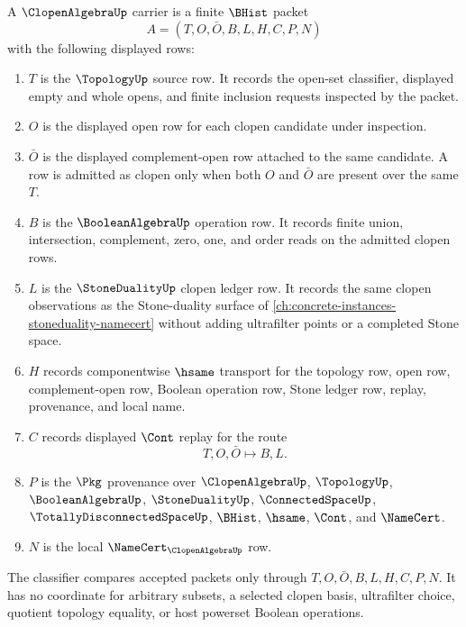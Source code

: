 \begin{definition}
\label{def:clopen-algebra-carrier}
A $\ClopenAlgebraUp$ carrier is a finite $\BHist$ packet
$$
A=(T,O,\bar O,B,L,H,C,P,N)
$$
with the following displayed rows:
\begin{enumerate}
\item $T$ is the $\TopologyUp$ source row. It records the open-set classifier, displayed empty and whole opens, and finite inclusion requests inspected by the packet.
\item $O$ is the displayed open row for each clopen candidate under inspection.
\item $\bar O$ is the displayed complement-open row attached to the same candidate. A row is admitted as clopen only when both $O$ and $\bar O$ are present over the same $T$.
\item $B$ is the $\BooleanAlgebraUp$ operation row. It records finite union, intersection, complement, zero, one, and order reads on the admitted clopen rows.
\item $L$ is the $\StoneDualityUp$ clopen ledger row. It records the same clopen observations as the Stone-duality surface of \autoref{ch:concrete-instances-stoneduality-namecert} without adding ultrafilter points or a completed Stone space.
\item $H$ records componentwise $\hsame$ transport for the topology row, open row, complement-open row, Boolean operation row, Stone ledger row, replay, provenance, and local name.
\item $C$ records displayed $\Cont$ replay for the route
$$
T,O,\bar O \longmapsto B,L .
$$
\item $P$ is the $\Pkg$ provenance over $\ClopenAlgebraUp$, $\TopologyUp$, $\BooleanAlgebraUp$, $\StoneDualityUp$, $\ConnectedSpaceUp$, $\TotallyDisconnectedSpaceUp$, $\BHist$, $\hsame$, $\Cont$, and $\NameCert$.
\item $N$ is the local $\NameCert_{\ClopenAlgebraUp}$ row.
\end{enumerate}
The classifier compares accepted packets only through $T,O,\bar O,B,L,H,C,P,N$. It has no coordinate for arbitrary subsets, a selected clopen basis, ultrafilter choice, quotient topology equality, or host powerset Boolean operations.
\end{definition}

